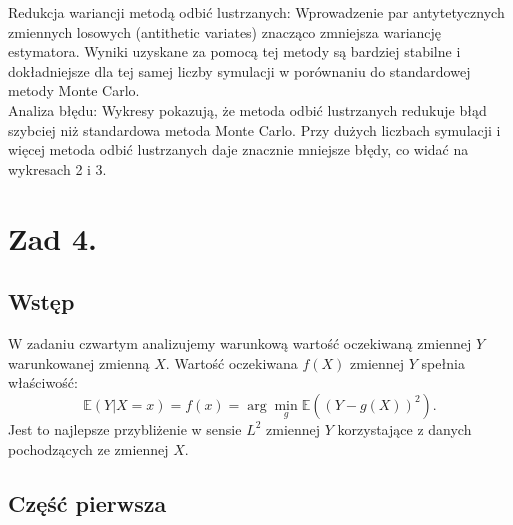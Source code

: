\documentclass[12pt,letterpaper]{article}
\theoremstyle{definition}
\begin{document}
Redukcja wariancji metodą odbić lustrzanych: 
Wprowadzenie par antytetycznych zmiennych losowych (antithetic variates) znacząco zmniejsza wariancję estymatora. Wyniki uzyskane za pomocą tej metody są bardziej stabilne i dokładniejsze dla tej samej liczby symulacji w porównaniu do standardowej metody Monte Carlo.\\

Analiza błędu: 
Wykresy pokazują, że metoda odbić lustrzanych redukuje błąd szybciej niż standardowa metoda Monte Carlo. Przy dużych liczbach symulacji i więcej metoda odbić lustrzanych daje znacznie mniejsze błędy, co widać na wykresach 2 i 3.\\
\section{Zad 4.}
\subsection{Wstęp}
W zadaniu czwartym analizujemy warunkową wartość oczekiwaną zmiennej \( Y \) warunkowanej zmienną \( X \). Wartość oczekiwana \( f(X) \) zmiennej \( Y \) spełnia właściwość:
\[
\mathbb{E}(Y | X = x) = f(x) = \arg \min_g \mathbb{E}\left( (Y - g(X))^2 \right).
\]
Jest to najlepsze przybliżenie w sensie \( L^2 \) zmiennej \( Y \) korzystające z danych pochodzących ze zmiennej \( X \).

\subsection{Część pierwsza}
\end{document}
